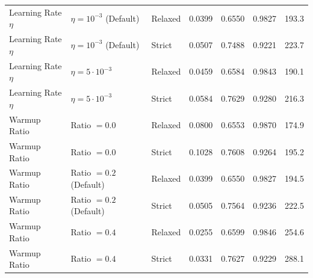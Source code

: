 \begin{tabular}{lllllll}
Learning Rate $\eta$ & $\eta=10^{-3}$ (Default) & Relaxed & 0.0399 & 0.6550 & 0.9827 & 193.3 \\
Learning Rate $\eta$ & $\eta=10^{-3}$ (Default) & Strict & 0.0507 & 0.7488 & 0.9221 & 223.7 \\
Learning Rate $\eta$ & $\eta=5\cdot 10^{-3}$ & Relaxed & 0.0459 & 0.6584 & 0.9843 & 190.1 \\
Learning Rate $\eta$ & $\eta=5\cdot 10^{-3}$ & Strict & 0.0584 & 0.7629 & 0.9280 & 216.3 \\
Warmup Ratio & Ratio $=0.0$ & Relaxed & 0.0800 & 0.6553 & 0.9870 & 174.9 \\
Warmup Ratio & Ratio $=0.0$ & Strict & 0.1028 & 0.7608 & 0.9264 & 195.2 \\
Warmup Ratio & Ratio $=0.2$ (Default) & Relaxed & 0.0399 & 0.6550 & 0.9827 & 194.5 \\
Warmup Ratio & Ratio $=0.2$ (Default) & Strict & 0.0505 & 0.7564 & 0.9236 & 222.5 \\
Warmup Ratio & Ratio $=0.4$ & Relaxed & 0.0255 & 0.6599 & 0.9846 & 254.6 \\
Warmup Ratio & Ratio $=0.4$ & Strict & 0.0331 & 0.7627 & 0.9229 & 288.1 \\
\bottomrule
\end{tabular}
